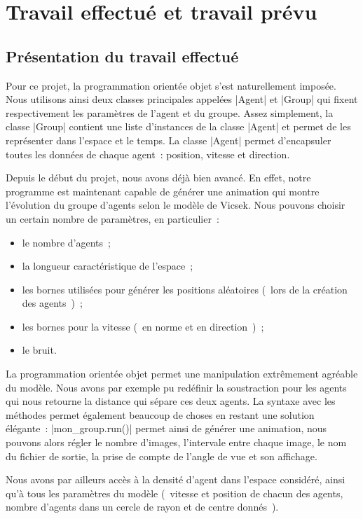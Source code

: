 \documentclass[french, a4paper, 12pt]{article}
\begin{document}
\section{Travail effectué et travail prévu}
	\subsection{Présentation du travail effectué}
     Pour ce projet, la programmation orientée objet s'est naturellement imposée. Nous utilisons ainsi deux classes principales appelées \python|Agent| et \python|Group| qui fixent respectivement les paramètres de l'agent et du groupe. Assez simplement, la classe \python|Group| contient une liste d'instances de la classe \python|Agent| et permet de les représenter dans l'espace et le temps. La classe \python|Agent| permet d'encapsuler toutes les données de chaque agent~: position, vitesse et direction.

     Depuis le début du projet, nous avons déjà bien avancé. En effet, notre programme est maintenant capable de générer une animation qui montre l'évolution du groupe d'agents selon le modèle de Vicsek. Nous pouvons choisir un certain nombre de paramètres, en particulier~:
	 \begin{itemize}
	 	\item le nombre d'agents~;
		\item la longueur caractéristique de l'espace~;
		\item les bornes utilisées pour générer les positions aléatoires (~lors de la création des agents~)~;
		\item les bornes pour la vitesse (~en norme et en direction~)~;
		\item le bruit.
	\end{itemize}
	La programmation orientée objet permet une manipulation extrêmement agréable du modèle. Nous avons par exemple pu redéfinir la soustraction pour les agents qui nous retourne la distance qui sépare ces deux agents. La syntaxe avec les méthodes permet également beaucoup de choses en restant une solution élégante~: \python|mon_group.run()| permet ainsi de générer une animation, nous pouvons alors régler le nombre d'images, l'intervale entre chaque image, le nom du fichier de sortie, la prise de compte de l'angle de vue et son affichage. 

	Nous avons par ailleurs accès à la densité d'agent dans l'espace considéré, ainsi qu'à tous les paramètres du modèle (~vitesse et position de chacun des agents, nombre d'agents dans un cercle de rayon et de centre donnés~).
	
\end{document}
